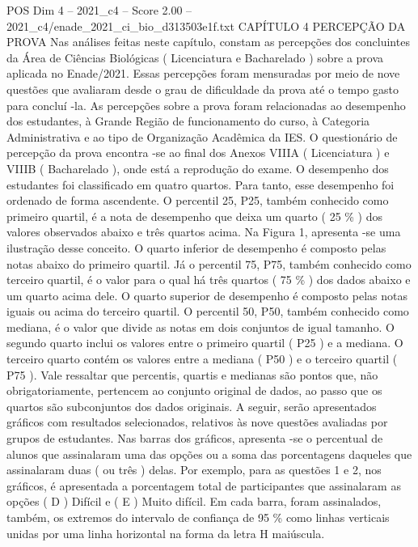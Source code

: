 \begin{textsample}{POS Dim 4 – 2021\_c4 – Score 2.00 – 2021\_c4/enade\_2021\_ci\_bio\_d313503e1f.txt}  \label{ex:f4_pos_134}
CAPÍTULO 4 PERCEPÇÃO DA PROVA Nas análises feitas neste capítulo, constam as percepções dos concluintes da Área de Ciências Biológicas ( Licenciatura e Bacharelado ) sobre a prova aplicada no Enade/2021.
Essas percepções foram mensuradas por meio de nove questões que avaliaram desde o grau de dificuldade da prova até o tempo gasto para concluí -la.
As percepções sobre a prova foram relacionadas ao desempenho dos estudantes, à Grande Região de funcionamento do curso, à Categoria Administrativa e ao tipo de Organização Acadêmica da IES.
O questionário de percepção da prova encontra -se ao final dos Anexos VIIIA ( Licenciatura ) e VIIIB ( Bacharelado ), onde está a reprodução do exame.
O desempenho dos estudantes foi classificado em quatro quartos.
Para tanto, esse desempenho foi ordenado de forma ascendente.
O percentil 25, P25, também conhecido como primeiro quartil, é a nota de desempenho que deixa um quarto ( 25 \% ) dos valores observados abaixo e três quartos acima.
Na Figura 1, apresenta -se uma ilustração desse conceito.
O quarto inferior de desempenho é composto pelas notas abaixo do primeiro quartil.
Já o percentil 75, P75, também conhecido como terceiro quartil, é o valor para o qual há três quartos ( 75 \% ) dos dados abaixo e um quarto acima dele.
O quarto superior de desempenho é composto pelas notas iguais ou acima do terceiro quartil.
O percentil 50, P50, também conhecido como mediana, é o valor que divide as notas em dois conjuntos de igual tamanho.
O segundo quarto inclui os valores entre o primeiro quartil ( P25 ) e a mediana.
O terceiro quarto contém os valores entre a mediana ( P50 ) e o terceiro quartil ( P75 ).
Vale ressaltar que percentis, quartis e medianas são pontos que, não obrigatoriamente, pertencem ao conjunto original de dados, ao passo que os quartos são subconjuntos dos dados originais.
A seguir, serão apresentados gráficos com resultados selecionados, relativos às nove questões avaliadas por grupos de estudantes.
Nas barras dos gráficos, apresenta -se o percentual de alunos que assinalaram uma das opções ou a soma das porcentagens daqueles que assinalaram duas ( ou três ) delas.
Por exemplo, para as questões 1 e 2, nos gráficos, é apresentada a porcentagem total de participantes que assinalaram as opções ( D ) Difícil e ( E ) Muito difícil.
Em cada barra, foram assinalados, também, os extremos do intervalo de confiança de 95 \% como linhas verticais unidas por uma linha horizontal na forma da letra H maiúscula.

\end{textsample}
